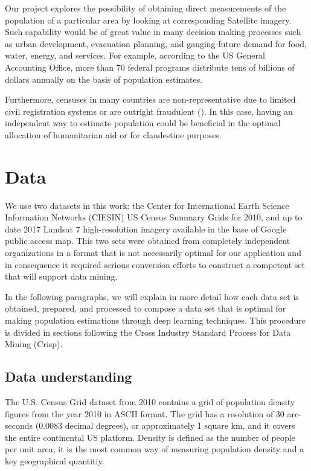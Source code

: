 \documentclass{article}
\begin{document}
Our project explores the possibility of obtaining direct measurements of the population of a particular area by looking at corresponding Satellite imagery. Such capability would be of great value in many decision making processes such as urban development, evacuation planning, and gauging future demand for food, water, energy, and services. For example, according to the US General Accounting Office, more than 70 federal programs distribute tens of billions of dollars annually on the basis of population estimates.

Furthermore, censuses in many countries are non-representative due to limited civil registration systems or are outright fraudulent (\cite{BDYPHN06}). In this case, having an independent way to estimate population could be beneficial in the optimal allocation of humanitarian aid or for clandestine purposes.

\section{Data}
We use two datasets in this work: the Center for International Earth Science Information Networks (CIESIN) US Census Summary Grids for 2010, and up to date 2017 Landsat 7 high-resolution imagery available in the base of Google public access map. This two sets were obtained from completely independent organizations in a format that is not necessarily optimal for our application and in consequence it required serious conversion efforts to construct a competent set that will support data mining.

In the following paragraphs, we will explain in more detail how each data set is obtained, prepared, and processed to compose a data set that is optimal for making population estimations through deep learning techniques. This procedure is divided in sections following the Cross Industry Standard Process for Data Mining (Crisp)\cite{PF13}.

\subsection{Data understanding}

The U.S. Census Grid dataset from 2010 contains a grid of population density figures from the year 2010 in ASCII format. The grid has a resolution of 30 arc-seconds (0.0083 decimal degrees), or approximately 1 square km, and it covers the entire continental US platform. Density is defined as the number of people per unit area, it is the most common way of measuring population density and a key geographical quantitiy.
\end{document}
